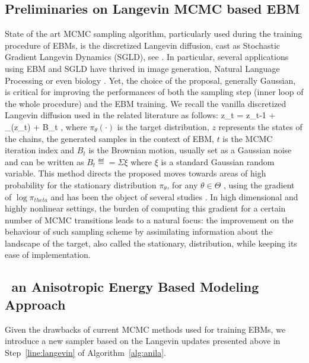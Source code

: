 \documentclass[10pt,twocolumn,letterpaper]{article}
\begin{document}
\subsection{Preliminaries on Langevin MCMC based EBM}
State of the art MCMC sampling algorithm, particularly used during the training procedure of EBMs, is the discretized Langevin diffusion, cast as Stochastic Gradient Langevin Dynamics (SGLD), see \cite{welling2011bayesian}.
In particular, several applications using EBM and SGLD have thrived in image generation, Natural Language Processing or even biology \cite{du2020energy}.
Yet, the choice of the proposal, generally Gaussian, is critical for improving the performances of both the sampling step (inner loop of the whole procedure) and the EBM training.
We recall the vanilla discretized Langevin diffusion used in the related literature as follows:
\beq\notag
z_t = z_{t-1} +  \nabla \log \pi_\theta(z_t) + \sqrt{\gamma} B_t \eqsp,
\eeq
where $\pi_\theta(\cdot)$ is the target distribution, $z$ represents the states of the chains, \ie the generated samples in the context of EBM, $t$ is the MCMC iteration index and $B_t$ is the Brownian motion, usually set as a Gaussian noise and can be written as $B_t \eqdef = \Sigma \xi$ where $\xi$ is a standard Gaussian random variable.
This method directs the proposed moves towards areas of high probability for the stationary distribution $\pi_\theta$, for any $\theta \in \Theta$ , using the gradient of $\log \pi_{theta}$ and has been the object of several studies \cite{girolami,cotter2013mcmc}.
In high dimensional and highly nonlinear settings, the burden of computing this gradient for a certain number of MCMC transitions leads to a natural focus: the improvement on the behaviour of such sampling scheme by assimilating information about the landscape of the target, also called the stationary, distribution, while keeping its ease of implementation.

\subsection{\algo\, an Anisotropic Energy Based Modeling Approach}

Given the drawbacks of current MCMC methods used for training EBMs, we introduce a new sampler based on the Langevin updates presented above in Step~\ref{line:langevin} of Algorithm~\ref{alg:anila}.
\end{document}
